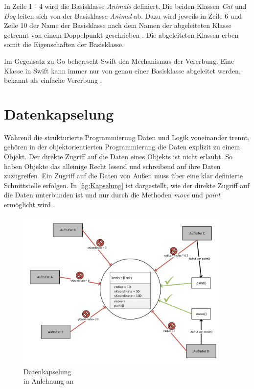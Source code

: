 In Zeile 1 - 4 wird die Basisklasse \emph{Animals} definiert. 
Die beiden Klassen \textit{Cat} und \textit{Dog} leiten sich von der Basisklasse \textit{Animal} ab. 
Dazu wird jeweils in Zeile 6 und Zeile 10 der Name der Basisklasse nach dem Namen der abgeleiteten Klasse getrennt von einem Doppelpunkt geschrieben \cite[S.226]{Apple.2017}.
Die abgeleiteten Klassen erben somit die Eigenschaften der Basisklasse. 

Im Gegensatz zu Go beherrscht Swift den Mechanismus der Vererbung.
Eine Klasse in Swift kann immer nur von genau einer Basisklasse abgeleitet werden, bekannt als einfache Vererbung \cite[S.125]{Hoffman.2017}.

\section{Datenkapselung}
Während die strukturierte Programmierung Daten und Logik voneinander trennt, gehören in der objektorientierten Programmierung die Daten explizit zu einem Objekt. 
Der direkte Zugriff auf die Daten eines Objekts ist nicht erlaubt. 
So haben Objekte das alleinige Recht lesend und schreibend auf ihre Daten zuzugreifen. 
Ein Zugriff auf die Daten von Außen muss über eine klar definierte Schnittstelle erfolgen.
In \autoref{fig:Kapselung} ist dargestellt, wie der direkte Zugriff auf die Daten unterbunden ist und nur durch die Methoden \emph{move} und \emph{paint} ermöglicht wird \cite[]{Lahres.2011}.

\begin{figure}[H]
    \centering
    \includegraphics[height=8cm]{Images/Kapselung.pdf}
    \caption{Datenkapselung \\ in Anlehnung an \cite[]{Lahres.2011}}
    \label{fig:Kapselung}
\end{figure}

